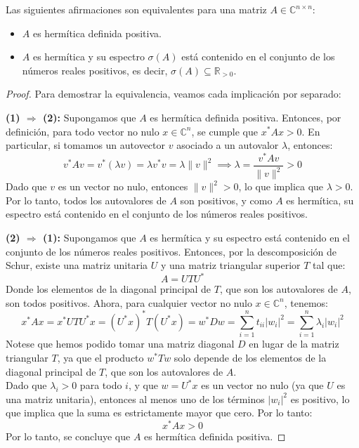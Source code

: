 \begin{proposición}
    Las siguientes afirmaciones son equivalentes para una matriz $ A \in \mathbb{C}^{n \times n} $:
    \begin{itemize}
        \item $ A $ es hermítica definida positiva.
        \item $ A $ es hermítica y su espectro $ \sigma(A) $ está contenido en el conjunto de los números reales positivos, es decir, $ \sigma(A) \subseteq \mathbb{R}_{>0} $.
    \end{itemize}
\end{proposición}

\begin{proof}
    Para demostrar la equivalencia, veamos cada implicación por separado:

    \textbf{(1) $ \Rightarrow $ (2):} Supongamos que $ A $ es hermítica definida positiva. Entonces, por definición, para todo vector no nulo $ x \in \mathbb{C}^n $, se cumple que $ x^* A x > 0 $. En particular, si tomamos un autovector $ v $ asociado a un autovalor $ \lambda $, entonces:
    \[
        v^* A v = v^* (\lambda v) = \lambda v^* v = \lambda \|v\|^2 \implies
        \lambda = \frac{v^* A v}{\|v\|^2} > 0
    \]
    Dado que $ v $ es un vector no nulo, entonces $ \|v\|^2 > 0 $, lo que implica que $ \lambda > 0 $. Por lo tanto, todos los autovalores de $ A $ son positivos, y como $ A $ es hermítica, su espectro está contenido en el conjunto de los números reales positivos.

    \textbf{(2) $ \Rightarrow $ (1):} Supongamos que $ A $ es hermítica y su espectro está contenido en el conjunto de los números reales positivos. Entonces, por la descomposición de Schur, existe una matriz unitaria $ U $ y una matriz triangular superior $ T $ tal que:
    \[
        A = UTU^*
    \]
    Donde los elementos de la diagonal principal de $ T $, que son los autovalores de $ A $, son todos positivos. Ahora, para cualquier vector no nulo $ x \in \mathbb{C}^n $, tenemos:
    \[
        x^* A x = x^* UTU^* x = (U^* x)^* T (U^* x) =
        w^* D w =
        \sum_{i=1}^{n} t_{ii} |w_i|^2 =
        \sum_{i=1}^{n} \lambda_i |w_i|^2
    \]
    Notese que hemos podido tomar una matriz diagonal $ D $ en lugar de la matriz triangular $ T $, ya que el producto $ w^* T w $ solo depende de los elementos de la diagonal principal de $ T $, que son los autovalores de $ A $.\\
    Dado que $ \lambda_i > 0 $ para todo $ i $, y que $ w = U^* x $ es un vector no nulo (ya que $ U $ es una matriz unitaria), entonces al menos uno de los términos $ |w_i|^2 $ es positivo, lo que implica que la suma es estrictamente mayor que cero. Por lo tanto:
    \[
        x^* A x > 0
    \]
    Por lo tanto, se concluye que $ A $ es hermítica definida positiva.
\end{proof}

